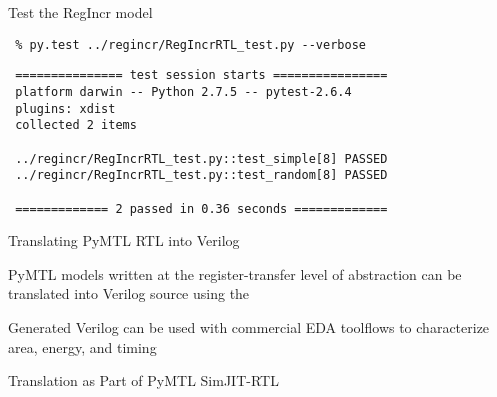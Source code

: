 \begin{task}\begin{frame}[fragile]{Test the RegIncr model}

\vspace{-0.19in}
\begin{Verbatim}[commandchars=\\\{\}]
 % cd    \midtilde/pymtl-tut/build
 % py.test ../regincr/RegIncrRTL_test.py --verbose
\end{Verbatim}
\smallskip
\begin{Verbatim}
 =============== test session starts ================
 platform darwin -- Python 2.7.5 -- pytest-2.6.4
 plugins: xdist
 collected 2 items

 ../regincr/RegIncrRTL_test.py::test_simple[8] PASSED
 ../regincr/RegIncrRTL_test.py::test_random[8] PASSED

 ============= 2 passed in 0.36 seconds =============
\end{Verbatim}

\end{frame}
\end{task}

\begin{frame}{Translating PyMTL RTL into Verilog}

\begin{cbxlist}

  \1 PyMTL models written at the register-transfer level of abstraction
     can be translated into Verilog source using the 

  \1 Generated Verilog can be used with commercial EDA toolflows to
    characterize area, energy, and timing

\end{cbxlist}

\vspace{0.3in}

\end{frame}

\begin{frame}{Translation as Part of PyMTL SimJIT-RTL}

  \vspace{0.2in}

\end{frame}

